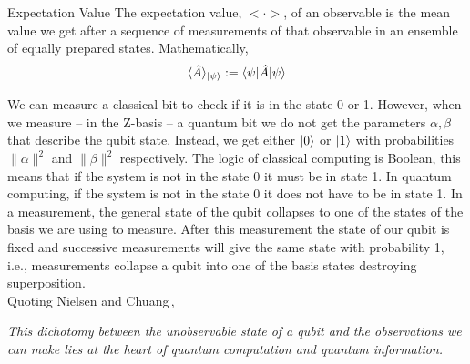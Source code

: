 \begin{definition}{Expectation Value}{}
    The expectation value, $<\cdot>$, of an observable is the mean value we get after a sequence of measurements of that observable in an ensemble of equally prepared states.
        Mathematically,
    \begin{equation}
        \langle\hat{A}\rangle_{\ket{\psi}} := \braket{\psi |\hat{A}| \psi}
    \end{equation}
\end{definition}
We can measure a classical bit to check if it is in the state 0 or 1. However, when we measure -- in the Z-basis -- a quantum bit we do not get the parameters $\alpha, \beta$ that describe the qubit state. Instead, we get either $\ket{0}$ or $\ket{1}$ with probabilities $\|\alpha\|^{2}$ and $\|\beta\|^{2}$ respectively. The logic of classical computing is Boolean, this means that if the system is not in the state 0 it must be in state 1. In quantum computing, if the system is not in the state 0 it does not have to be in state 1.   
In a measurement, the general state of the qubit collapses to one of the states of the basis we are using to measure. After this measurement the state of our qubit is fixed and successive measurements will give the same state with probability 1, i.e., measurements collapse a qubit into one of the basis states destroying superposition.\\
Quoting Nielsen and Chuang\,\cite{Nielsen2010QuantumInformation},
\begin{displayquote}
\textit{This dichotomy between the unobservable state of a qubit and the observations we can make lies at the heart of quantum computation and quantum information.}
\end{displayquote}
